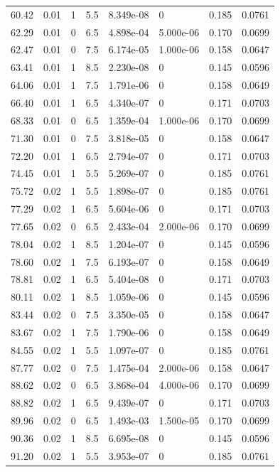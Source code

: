 \documentclass[preview]{standalone}
\begin{document}
{{{\begin{tabular}{L{1.2cm}C{1.2cm} C{0.3cm}C{0.5cm} C{1.4cm}C{1.4cm} C{1.4cm}C{1.4cm}}
  60.42  &  0.01  & 1     & 5.5 &  8.349e-08  & 0  & 0.185 &  0.0761   \\ 
  62.29  &  0.01  & 0     & 6.5 &  4.898e-04  & 5.000e-06  & 0.170 &  0.0699   \\ 
  62.47  &  0.01  & 0     & 7.5 &  6.174e-05  & 1.000e-06  & 0.158 &  0.0647   \\ 
  63.41  &  0.01  & 1     & 8.5 &  2.230e-08  & 0  & 0.145 &  0.0596   \\ 
  64.06  &  0.01  & 1     & 7.5 &  1.791e-06  & 0  & 0.158 &  0.0649   \\ 
  66.40  &  0.01  & 1     & 6.5 &  4.340e-07  & 0  & 0.171 &  0.0703   \\ 
  68.33  &  0.01  & 0     & 6.5 &  1.359e-04  & 1.000e-06  & 0.170 &  0.0699   \\ 
  71.30  &  0.01  & 0     & 7.5 &  3.818e-05  & 0  & 0.158 &  0.0647   \\ 
  72.20  &  0.01  & 1     & 6.5 &  2.794e-07  & 0  & 0.171 &  0.0703   \\ 
  74.45  &  0.01  & 1     & 5.5 &  5.269e-07  & 0  & 0.185 &  0.0761   \\ 
  75.72  &  0.02  & 1     & 5.5 &  1.898e-07  & 0  & 0.185 &  0.0761   \\ 
  77.29  &  0.02  & 1     & 6.5 &  5.604e-06  & 0  & 0.171 &  0.0703   \\ 
  77.65  &  0.02  & 0     & 6.5 &  2.433e-04  & 2.000e-06  & 0.170 &  0.0699   \\ 
  78.04  &  0.02  & 1     & 8.5 &  1.204e-07  & 0  & 0.145 &  0.0596   \\ 
  78.60  &  0.02  & 1     & 7.5 &  6.193e-07  & 0  & 0.158 &  0.0649   \\ 
  78.81  &  0.02  & 1     & 6.5 &  5.404e-08  & 0  & 0.171 &  0.0703   \\ 
  80.11  &  0.02  & 1     & 8.5 &  1.059e-06  & 0  & 0.145 &  0.0596   \\ 
  83.44  &  0.02  & 0     & 7.5 &  3.350e-05  & 0  & 0.158 &  0.0647   \\ 
  83.67  &  0.02  & 1     & 7.5 &  1.790e-06  & 0  & 0.158 &  0.0649   \\ 
  84.55  &  0.02  & 1     & 5.5 &  1.097e-07  & 0  & 0.185 &  0.0761   \\ 
  87.77  &  0.02  & 0     & 7.5 &  1.475e-04  & 2.000e-06  & 0.158 &  0.0647   \\ 
  88.62  &  0.02  & 0     & 6.5 &  3.868e-04  & 4.000e-06  & 0.170 &  0.0699   \\ 
  88.82  &  0.02  & 1     & 6.5 &  9.439e-07  & 0  & 0.171 &  0.0703   \\ 
  89.96  &  0.02  & 0     & 6.5 &  1.493e-03  & 1.500e-05  & 0.170 &  0.0699   \\ 
  90.36  &  0.02  & 1     & 8.5 &  6.695e-08  & 0  & 0.145 &  0.0596   \\ 
  91.20  &  0.02  & 1     & 5.5 &  3.953e-07  & 0  & 0.185 &  0.0761   \\ 
\hline 
\end{tabular} 

}}}
\end{document}
